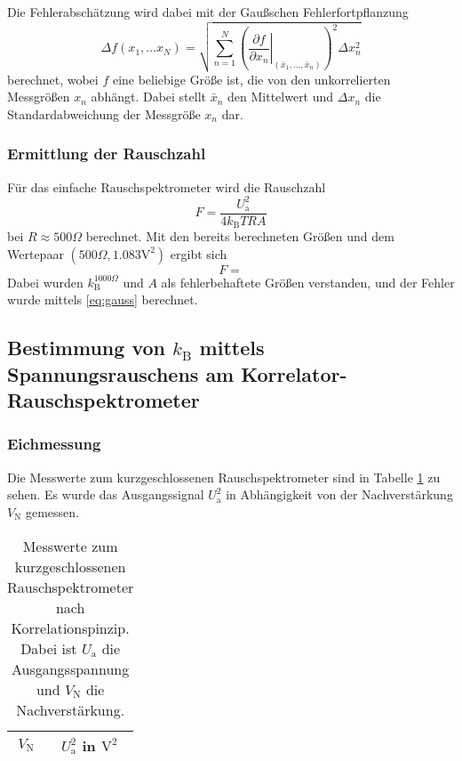 		Die Fehlerabschätzung wird dabei mit der Gaußschen Fehlerfortpflanzung
		\begin{equation}
		\Delta f(x_1,\ldots x_N)
		=\sqrt{ \sum_{n=1}^N \left(\left.\frac{\partial f}{\partial x_n}\right|
		_{(\bar{x}_1,\ldots,\bar{x}_n)}\right)^2
		\Delta x_n ^2 } \label{eq:gauss}
		\end{equation}
		berechnet, wobei $f$ eine beliebige Größe ist, die von den unkorrelierten
		Messgrößen $x_n$ abhängt. Dabei  stellt $\bar{x}_n$ den Mittelwert und
		$\Delta x_n$ die Standardabweichung der Messgröße $x_n$ dar.


	\subsubsection{Ermittlung der Rauschzahl}
		Für das einfache Rauschspektrometer wird die Rauschzahl
		\begin{equation}
			F = \frac{U_\text{a}^2}{4 k_\text{B}T R A}
		\end{equation}
		bei $R\approx 500\Omega$ berechnet. Mit den bereits berechneten Größen und
		dem Wertepaar $(500\Omega,1.083 \text{V}^2)$ ergibt sich
		\begin{equation}
			F = 
		\end{equation}
		Dabei wurden $k_\text{B}^{1000\Omega}$ und $A$ als fehlerbehaftete Größen
		verstanden, und der Fehler wurde mittels \eqref{eq:gauss} berechnet.






\clearpage
\subsection{Bestimmung von $k_\text{B}$ mittels Spannungsrauschens am
			Korrelator-Rauschspektrometer}

		\subsubsection{Eichmessung}

		Die Messwerte zum kurzgeschlossenen Rauschspektrometer sind
		in Tabelle \ref{tab:eichung_eigenrauschen_korr} zu sehen.
		Es wurde das Ausgangssignal $U^2_\text{a}$ in Abhängigkeit von
		der Nachverstärkung $V_\text{N}$ gemessen.

		\begin{table}[h]
		\centering
			\begin{tabular}{cc}
				\toprule \midrule
				$V_\text{N}$ & $U^2_\text{a}$ in $\text{V}^2$
				\\
				\midrule
				
				\midrule \bottomrule
			\end{tabular}
			\caption{Messwerte zum kurzgeschlossenen
			Rauschspektrometer nach Korrelationspinzip. Dabei ist $U_\text{a}$ die
			Ausgangsspannung und $V_\text{N}$ die Nachverstärkung.}
			\label{tab:eichung_eigenrauschen_korr}
		\end{table}

